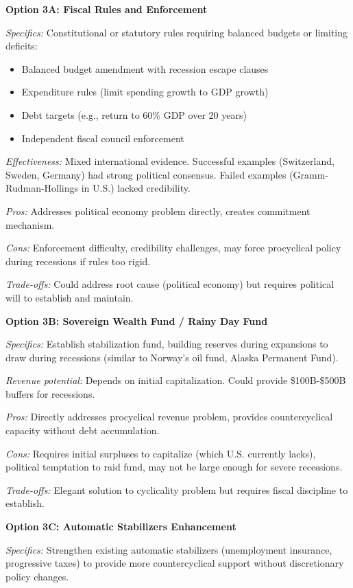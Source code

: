 \documentclass[12pt,letterpaper]{article}
\begin{document}
\textbf{Option 3A: Fiscal Rules and Enforcement}

\textit{Specifics:} Constitutional or statutory rules requiring balanced budgets or limiting deficits:
\begin{itemize}
    \item Balanced budget amendment with recession escape clauses
    \item Expenditure rules (limit spending growth to GDP growth)
    \item Debt targets (e.g., return to 60\% GDP over 20 years)
    \item Independent fiscal council enforcement
\end{itemize}

\textit{Effectiveness:} Mixed international evidence. Successful examples (Switzerland, Sweden, Germany) had strong political consensus. Failed examples (Gramm-Rudman-Hollings in U.S.) lacked credibility.

\textit{Pros:} Addresses political economy problem directly, creates commitment mechanism.

\textit{Cons:} Enforcement difficulty, credibility challenges, may force procyclical policy during recessions if rules too rigid.

\textit{Trade-offs:} Could address root cause (political economy) but requires political will to establish and maintain.

\textbf{Option 3B: Sovereign Wealth Fund / Rainy Day Fund}

\textit{Specifics:} Establish stabilization fund, building reserves during expansions to draw during recessions (similar to Norway's oil fund, Alaska Permanent Fund).

\textit{Revenue potential:} Depends on initial capitalization. Could provide \$100B-\$500B buffers for recessions.

\textit{Pros:} Directly addresses procyclical revenue problem, provides countercyclical capacity without debt accumulation.

\textit{Cons:} Requires initial surpluses to capitalize (which U.S. currently lacks), political temptation to raid fund, may not be large enough for severe recessions.

\textit{Trade-offs:} Elegant solution to cyclicality problem but requires fiscal discipline to establish.

\textbf{Option 3C: Automatic Stabilizers Enhancement}

\textit{Specifics:} Strengthen existing automatic stabilizers (unemployment insurance, progressive taxes) to provide more countercyclical support without discretionary policy changes.
\end{document}
